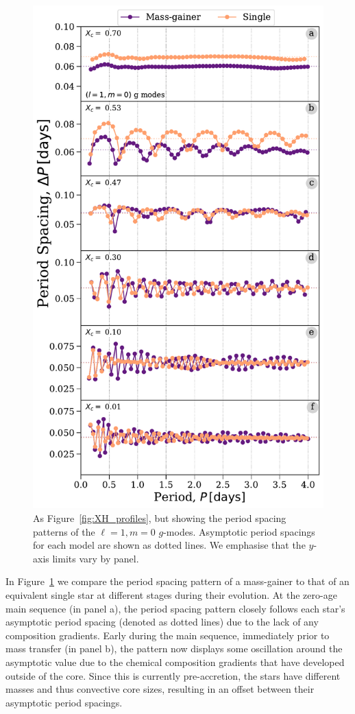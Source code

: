 \documentclass[twocolumn, twocolappendix, oneside]{aastex631}
\newcommand{\gmodes}{$g$-modes\xspace}
\begin{document}
\begin{figure}[bt]
    \centering
    \includegraphics[width=\columnwidth]{figures/period_spacing_mdm20.pdf}
    \caption{As Figure~\ref{fig:XH_profiles}, but showing the period spacing patterns of the $\ell = 1, m = 0$ \gmodes. Asymptotic period spacings for each model are shown as dotted lines. We emphasise that the $y$-axis limits vary by panel.}
    \label{fig:period_spacing}
\end{figure}

In Figure~\ref{fig:period_spacing} we compare the period spacing pattern of a mass-gainer to that of an equivalent single star at different stages during their evolution. At the zero-age main sequence (in panel a), the period spacing pattern closely follows each star's asymptotic period spacing (denoted as dotted lines) due to the lack of any composition gradients. Early during the main sequence, immediately prior to mass transfer (in panel b), the pattern now displays some oscillation around the asymptotic value due to the chemical composition gradients that have developed outside of the core. Since this is currently pre-accretion, the stars have different masses and thus convective core sizes, resulting in an offset between their asymptotic period spacings.
\end{document}
